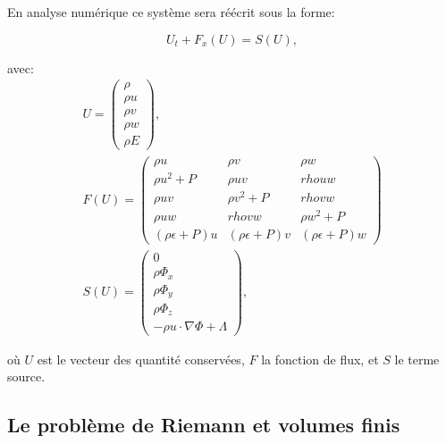 En analyse numérique ce système sera réécrit sous la forme:

\begin{equation}
U_t+F_x(U) = S(U),
\label{eq:conservation}
\end{equation}

avec:
\begin{equation}
\begin{array}{c}

U=
\left(
\begin{array}{c}
{ \rho}\\
{\rho u}\\
{\rho v}\\
{\rho w}\\
{\rho E}
\end{array}
\right),
\\
F(U)=
\left(
\begin{array}{ccc}
\rho u & \rho v & \rho w \\ 
\rho u^2 +P & \rho uv & rho uw \\ 
\rho uv & \rho v^2 +P & rho vw \\ 
\rho uw & rho vw &\rho w^2 +P \\ 
(\rho \epsilon + P)u & (\rho \epsilon + P)v & (\rho \epsilon + P)w
\end{array} 
\right)
\\
S(U) =
\left(
\begin{array}{c}
{ 0}\\
{\rho \Phi_x}\\
{\rho \Phi_y}\\
{\rho \Phi_z}\\
{- \rho u \cdot \nabla \Phi + \Lambda }
\end{array}
\right),
\end{array} 
\end{equation}

où $U$ est le vecteur des quantité conservées, $F$ la fonction de flux, et $S$ le terme source.

\subsection{Le problème de Riemann et volumes finis}

